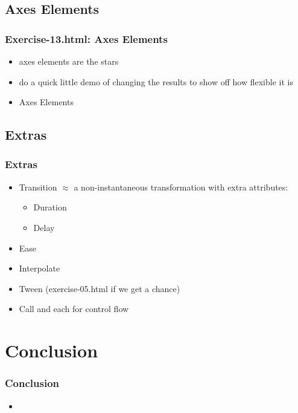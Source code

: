 \documentclass{beamer}
\begin{document}
\subsection{Axes Elements}

\begin{frame}
    \frametitle{Exercise-13.html: Axes Elements}
    \begin{itemize}
    \item axes elements are the stars
    \item do a quick little demo of changing the results to show off how flexible it is
    \item Axes Elements
    \end{itemize} 
\end{frame}



\subsection{Extras}

\begin{frame}
    \frametitle{Extras}
    \begin{itemize}
    \item Transition $\approx$ a non-instantaneous transformation with extra attributes:
        \begin{itemize}
        \item Duration
        \item Delay
        \end{itemize}
    \item Ease
    \item Interpolate
    \item Tween (exercise-05.html if we get a chance)
    \item Call and each for control flow 
    \end{itemize}
\end{frame}



\section{Conclusion}

\begin{frame}
    \frametitle{Conclusion}
    \begin{itemize}
    \item 
    \end{itemize}
\end{frame}
\end{document}
